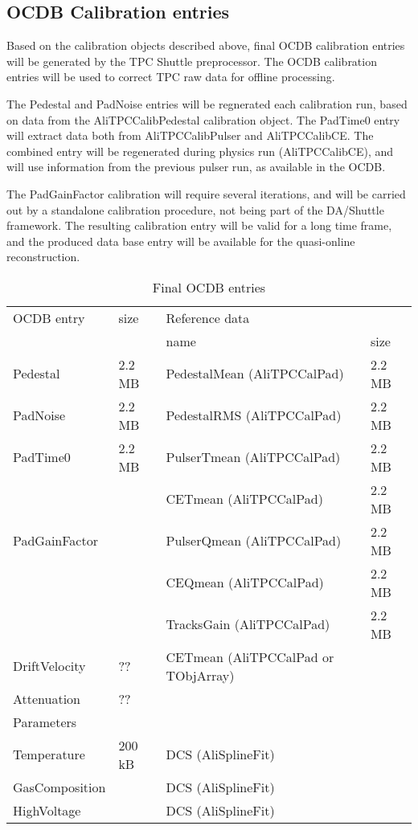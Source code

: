 \documentclass[a4paper,12pt]{article}
\begin{document}
\subsection{OCDB Calibration entries}
Based on the calibration objects described above, final OCDB calibration entries
will be generated by the TPC Shuttle preprocessor. The OCDB calibration entries
will be used to correct TPC raw data for offline processing.
 
The Pedestal and PadNoise entries will be regnerated each calibration run, based
on data from the AliTPCCalibPedestal calibration object. The PadTime0 entry will
extract data both from AliTPCCalibPulser and AliTPCCalibCE. The combined entry
will be regenerated during physics run (AliTPCCalibCE), and will use information
from the previous pulser run, as available in the OCDB. 

The PadGainFactor calibration will require several iterations, and will be
carried out by a standalone calibration procedure, not being part of the
DA/Shuttle framework. The resulting calibration entry will be valid for a long
time frame, and the produced data base entry will be available for the
quasi-online reconstruction.

\begin{table}
 \caption{Final OCDB entries}
 \label{ocdbtable} 
 \begin{tabular}{|l|l|l|l|} \hline
 OCDB entry & size & \multicolumn{2}{|l|}{Reference data} \\ \cline{3-4}
            &      & name & size \\ \hline
 Pedestal & 2.2 MB & PedestalMean (AliTPCCalPad) & 2.2 MB \\ \hline
 PadNoise & 2.2 MB & PedestalRMS  (AliTPCCalPad) & 2.2 MB \\ \hline
 PadTime0 & 2.2 MB & PulserTmean  (AliTPCCalPad) & 2.2 MB \\ 
          &        & CETmean      (AliTPCCalPad) & 2.2 MB \\ \hline
 PadGainFactor &   & PulserQmean  (AliTPCCalPad) & 2.2 MB \\
          &        & CEQmean      (AliTPCCalPad) & 2.2 MB \\ 
	  &        & TracksGain   (AliTPCCalPad) & 2.2 MB \\ \hline
 DriftVelocity & ?? & CETmean (AliTPCCalPad or TObjArray) &  \\ \hline 
 Attenuation   & ?? &                                     & \\ \hline
 Parameters    &    &                                     & \\ \hline
 Temperature   & 200 kB & DCS (AliSplineFit)              & \\ \hline
 GasComposition &       & DCS (AliSplineFit)              & \\ \hline
 HighVoltage   &        & DCS (AliSplineFit)              & \\ \hline
 \end{tabular}
\end{table}  
\end{document}
